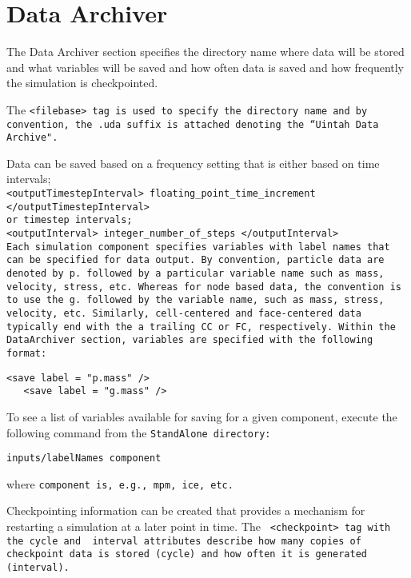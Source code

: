 \section{Data Archiver} \label{Sec:DataArchiver}

The Data Archiver section specifies the directory name where data will
be stored and what variables will be saved and how often data is saved
and how frequently the simulation is checkpointed.

The \tt <filebase> \normalfont tag is used to specify the directory
name and by convention, the \tt .uda \normalfont suffix is attached denoting the
``Uintah Data Archive".

Data can be saved based on a frequency setting that is either based on time
intervals;\\
\tt <outputTimestepInterval> floating\_point\_time\_increment </outputTimestepInterval> \normalfont\\
or timestep intervals; \\
\tt <outputInterval> integer\_number\_of\_steps </outputInterval> \normalfont\\

Each simulation component specifies variables with label names that
can be specified for data output.  By convention, particle data are
denoted by \tt p. \normalfont followed by a particular variable name
such as mass, velocity, stress, etc.  Whereas for node based data, the
convention is to use the \tt g. \normalfont followed by the variable
name, such as mass, stress, velocity, etc.  Similarly, cell-centered
and face-centered data typically end with the a trailing \tt CC \normalfont
or \tt FC, \normalfont  respectively.  Within the DataArchiver
section, variables are specified with the following format:

\begin{Verbatim}[fontsize=\footnotesize]
   <save label = "p.mass" />
   <save label = "g.mass" />
\end{Verbatim}

To see a list of
variables available for saving for a given component, execute the following
command from the \tt StandAlone \normalfont directory:

\begin{Verbatim}[fontsize=\footnotesize]
inputs/labelNames component
\end{Verbatim}
where \tt component \normalfont is, e.g., \tt mpm, \normalfont \tt ice, \normalfont etc.

Checkpointing information can be created that provides a mechanism for
restarting a simulation at a later point in time.  The \tt
<checkpoint> \normalfont tag with the \tt cycle \normalfont and \tt
interval \normalfont attributes describe how many copies of checkpoint
data is stored (cycle)  and how often it is generated (interval).

